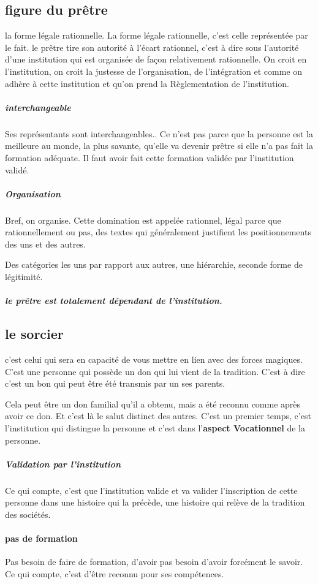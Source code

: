 \subsection{figure du prêtre}
la forme légale rationnelle. La forme légale rationnelle, c'est celle représentée par le fait.
 le prêtre tire son autorité à  l'écart rationnel, c'est à  dire sous l'autorité d'une institution qui est organisée de façon relativement rationnelle. On croit en l'institution, on croit la justesse de l'organisation, de l'intégration et comme on adhère à  cette institution et qu'on prend la Règlementation de l'institution.
\subparagraph{interchangeable} Ses représentants sont interchangeables.. Ce n'est pas parce que la personne est la meilleure au monde, la plus savante, qu'elle va devenir prêtre si elle n'a pas fait la formation adéquate.
Il faut avoir fait cette formation validée par l'institution validé.  


\subparagraph{Organisation}
Bref, on organise.  Cette domination est appelée rationnel, légal parce que rationnellement ou pas, des textes qui généralement justifient les positionnements des uns et des autres.


Des catégories les uns par rapport aux autres, une hiérarchie,  seconde forme de légitimité.
\subparagraph{le prêtre est totalement dépendant de l'institution.}

 
\subsection{le sorcier}  

\begin{Def}[sorcier]
    c'est celui qui sera en capacité de vous mettre en lien avec des forces magiques. C'est une personne qui possède un don qui lui vient de la tradition. C'est à  dire c'est un bon qui peut être été transmis par un ses parents. 
\end{Def}

Cela peut être un don familial qu'il a obtenu, mais a été reconnu comme après avoir ce don. Et c'est là  le salut distinct des autres.
C'est un premier temps, c'est l'institution qui distingue la personne et c'est dans l'\textbf{aspect Vocationnel} de la personne. 

\subparagraph{Validation par l'institution} Ce qui compte, c'est que l'institution valide et va valider l'inscription de cette personne dans une histoire qui la précède, une histoire qui relève de la tradition des sociétés. 

\paragraph{pas de formation}
Pas besoin de faire de formation, d'avoir pas besoin d'avoir forcément le savoir. Ce qui compte, c'est d'être reconnu pour ses compétences. 

